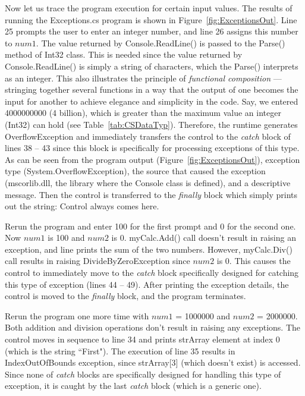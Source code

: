 Now let us trace the program execution for certain input values.
The results of running the Exceptions.cs program is shown in
Figure~\ref{fig:ExceptionsOut}. Line 25 prompts the user to enter
an integer number, and line 26 assigns this number to $num1$. The
value returned by Console.ReadLine() is passed to the Parse()
method of Int32 class. This is needed since the value returned by
Console.ReadLine() is simply a string of characters, which the
Parse() interprets as an integer. This also illustrates the
principle of \emph{functional composition} --- stringing together
several functions in a way that the output of one becomes the
input for another to achieve elegance and simplicity in the code.
Say, we entered 4000000000 (4 billion), which is greater than the
maximum value an integer (Int32) can hold (see
Table~\ref{tab:CSDataTyp}). Therefore, the runtime generates
OverflowException and immediately transfers the control to the
\emph{catch} block of lines 38 -- 43 since this block is
specifically for processing exceptions of this type. As can be
seen from the program output (Figure~\ref{fig:ExceptionsOut}),
exception type (System.OverflowException), the source that caused
the exception (mscorlib.dll, the library where the Console class
is defined), and a descriptive message. Then the control is
transferred to the \emph{finally} block which simply prints out
the string: Control always comes here.


Rerun the program and enter 100 for the first prompt and 0 for the
second one. Now $num1$ is 100 and $num2$ is 0. myCalc.Add() call
doesn't result in raising an exception, and line prints the sum of
the two numbers. However, myCalc.Div() call results in raising
DivideByZeroException since $num2$ is 0. This causes the control
to immediately move to the \emph{catch} block specifically
designed for catching this type of exception (lines 44 -- 49).
After printing the exception details, the control is moved to the
\emph{finally} block, and the program terminates.

Rerun the program one more time with $num1$ = 1000000 and $num2$ =
2000000. Both addition and division operations don't result in
raising any exceptions. The control moves in sequence to line 34
and prints strArray element at index 0 (which is the string
``First"). The execution of line 35 results in IndexOutOfBounds
exception, since strArray[3] (which doesn't exist) is accessed.
Since none of \emph{catch} blocks are specifically designed for
handling this type of exception, it is caught by the last
\emph{catch} block (which is a generic one).

